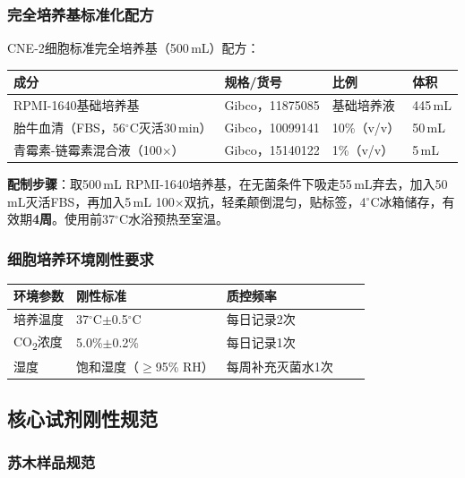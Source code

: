 \documentclass[12pt,a4paper]{article}
\newcommand{\degC}{$^\circ$C}
\begin{document}
\subsubsection{完全培养基标准化配方}

CNE-2细胞标准完全培养基（500\,mL）配方：

\begin{center}
\begin{tabular}{llll}
\toprule
\textbf{成分} & \textbf{规格/货号} & \textbf{比例} & \textbf{体积} \\
\midrule
RPMI-1640基础培养基 & Gibco，11875085 & 基础培养液 & 445\,mL \\
胎牛血清（FBS，56\degC{}灭活30\,min）& Gibco，10099141 & 10\%（v/v）& 50\,mL \\
青霉素-链霉素混合液（100×）& Gibco，15140122 & 1\%（v/v）& 5\,mL \\
\bottomrule
\end{tabular}
\end{center}

\textbf{配制步骤}：取500\,mL RPMI-1640培养基，在无菌条件下吸走55\,mL弃去，加入50\,mL灭活FBS，再加入5\,mL 100×双抗，轻柔颠倒混匀，贴标签，4\degC{}冰箱储存，有效期\textbf{4周}。使用前37\degC{}水浴预热至室温。

\subsubsection{细胞培养环境刚性要求}

\begin{center}
\begin{tabular}{lllll}
\toprule
\rowcolor{tabheadbg}\color{white}\textbf{环境参数} & \color{white}\textbf{刚性标准} & \color{white}\textbf{质控频率} \\
\midrule
培养温度 & 37\degC{}$\pm$0.5\degC{} & 每日记录2次 \\
CO\textsubscript{2}浓度 & 5.0\%$\pm$0.2\% & 每日记录1次 \\
湿度 & 饱和湿度（$\geq$95\% RH）& 每周补充灭菌水1次 \\
\bottomrule
\end{tabular}
\end{center}

\subsection{核心试剂刚性规范}

\subsubsection{苏木样品规范}
\end{document}

